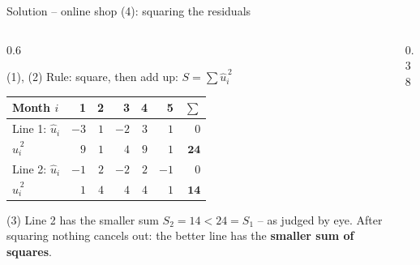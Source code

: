 \documentclass[aspectratio=169,11pt]{beamer}
\def\shoplist{1/21,2/26,3/24,4/30,5/29}
\newcommand{\residualsof}[4]{%
  \foreach \px/\py in #1 {%
    \pgfmathsetmacro{\yh}{#2 + #3*\px}%
    \edef\tmpdraw{\noexpand\draw[#4] (axis cs:\px,\py) -- (axis cs:\px,\yh);}%
    \tmpdraw
  }}
\newcommand{\squaresof}[3]{%
  \foreach \px/\py in #1 {%
    \pgfmathsetmacro{\yh}{#2 + #3*\px}%
    \pgfmathsetmacro{\ur}{abs(\py - \yh)}%
    \pgfmathsetmacro{\pxr}{\px + \ur}%
    \edef\tmpdraw{\noexpand\fill[hsbirot!18] (axis cs:\px,\yh) rectangle (axis cs:\pxr,\py);}%
    \tmpdraw
  }%
  \foreach \px/\py in #1 {%
    \pgfmathsetmacro{\yh}{#2 + #3*\px}%
    \pgfmathsetmacro{\ur}{abs(\py - \yh)}%
    \pgfmathsetmacro{\pxr}{\px + \ur}%
    \edef\tmpdraw{\noexpand\draw[hsbirot, line width=0.8pt] (axis cs:\px,\yh) rectangle (axis cs:\pxr,\py);}%
    \tmpdraw
  }}
\begin{document}
\begin{frame}{Solution -- online shop (4): squaring the residuals}
  \begin{columns}[T]
    \begin{column}{0.6\textwidth}
      \begin{block}{(1), (2) Rule: square, then add up: $S = \sum \hat{u}_i^{\,2}$}
        \begin{center}
          \small
          \renewcommand{\arraystretch}{1.05}
          \begin{tabular}{lrrrrrr}
            \toprule
            Month $i$                                      & 1    & 2   & 3    & 4   & 5    & $\sum$ \\
            \midrule
            {\color{hsbiorange!85!black}Line 1}: $\hat{u}_i$ & $-3$ & $1$ & $-2$ & $3$ & $1$  & $0$ \\
            \phantom{Line 1: }$\hat{u}_i^{\,2}$             & $9$  & $1$ & $4$  & $9$ & $1$  & $\mathbf{24}$ \\
            \midrule
            {\color{hsbiviolett}Line 2}: $\hat{u}_i$        & $-1$ & $2$ & $-2$ & $2$ & $-1$ & $0$ \\
            \phantom{Line 2: }$\hat{u}_i^{\,2}$             & $1$  & $4$ & $4$  & $4$ & $1$  & $\mathbf{14}$ \\
            \bottomrule
          \end{tabular}
        \end{center}
      \end{block}
      \begin{alertblock}{(3) Line 2 has the smaller sum}
        $S_2 = 14 < 24 = S_1$ -- as judged by eye. After squaring nothing
        cancels out: the better line has the \textbf{smaller sum of squares}.
      \end{alertblock}
    \end{column}
    \begin{column}{0.38\textwidth}
      \begin{center}
\end{center}
\end{column}
\end{columns}
\end{frame}
\end{document}

